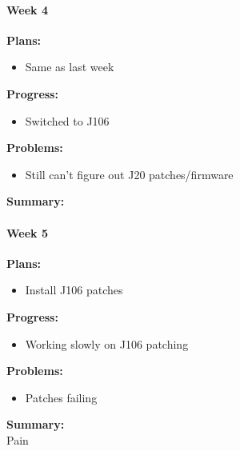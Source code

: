 \paragraph{Week 4}
\begin{adjustwidth}{2.5em}{0pt}
    \vspace{-0.5cm}\textbf{Plans:}
    \vspace{-0.5cm}
    \begin{itemize}
        \item Same as last week
    \end{itemize} 
    \vspace{-0.3cm}\textbf{Progress:}
    \vspace{-0.5cm}
    \begin{itemize}
        \item Switched to J106
    \end{itemize} 
    \vspace{-0.3cm}\textbf{Problems:}
    \vspace{-0.5cm}
    \begin{itemize}
        \item Still can't figure out J20 patches/firmware
    \end{itemize}  
    \vspace{-0.3cm}\noindent\textbf{Summary:}\\
    \noindent 
\end{adjustwidth} 

\paragraph{Week 5}
\begin{adjustwidth}{2.5em}{0pt}
    \vspace{-0.5cm}\textbf{Plans:}
    \vspace{-0.5cm}
    \begin{itemize}
        \item Install J106 patches
    \end{itemize} 
    \vspace{-0.3cm}\textbf{Progress:}
    \vspace{-0.5cm}
    \begin{itemize}
        \item Working slowly on J106 patching
    \end{itemize} 
    \vspace{-0.3cm}\textbf{Problems:}
    \vspace{-0.5cm}
    \begin{itemize}
        \item Patches failing
    \end{itemize}  
    \vspace{-0.3cm}\noindent\textbf{Summary:}\\
    \noindent 
    Pain
\end{adjustwidth} 


